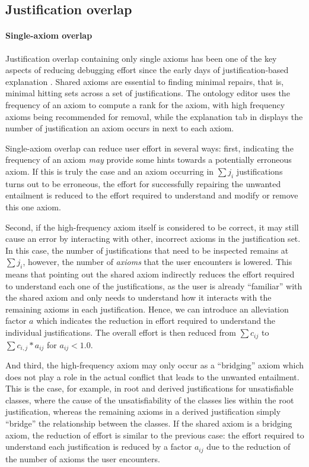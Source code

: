 \subsection{Justification overlap}

\paragraph{Single-axiom overlap}

Justification overlap containing only single axioms has been one of the key aspects of reducing debugging effort since the early days of justification-based explanation \cite{schlobach03nc,kalyanpur06nm}. Shared axioms are essential to finding minimal repairs, that is, minimal hitting sets across a set of justifications. The ontology editor \swoop uses the frequency of an axiom to compute a rank for the axiom, with high frequency axioms being recommended for removal, while the explanation tab in \protege displays the number of justification an axiom occurs in next to each axiom.

Single-axiom overlap can reduce user effort in several ways: first, indicating the frequency of an axiom \emph{may} provide some hints towards a potentially erroneous axiom. If this is truly the case and an axiom occurring in $\sum j_{i}$ justifications turns out to be erroneous, the effort for successfully repairing the unwanted entailment is reduced to the effort required to understand and modify or remove this one axiom.

Second, if the high-frequency axiom itself is considered to be correct, it may still cause an error by interacting with other, incorrect axioms in the justification set. In this case, the number of justifications that need to be inspected remains at $\sum j_{i}$, however, the number of \emph{axioms} that the user encounters is lowered. This means that pointing out the shared axiom indirectly reduces the effort required to understand each one of the justifications, as the user is already \enquote{familiar} with the shared axiom and only needs to understand how it interacts with the remaining axioms in each justification. Hence, we can introduce an alleviation factor $a$ which indicates the reduction in effort required to understand the individual justifications. The overall effort is then reduced from $\sum c_{ij}$ to $\sum c_{i,j} * a_{ij}$ for $a_{ij} < 1.0$.

And third, the high-frequency axiom may only occur as a \enquote{bridging} axiom which does not play a role in the actual conflict that leads to the unwanted entailment. This is the case, for example, in root and derived justifications for unsatisfiable classes, where the cause of the unsatisfiability of the classes lies within the root justification, whereas the remaining axioms in a derived justification simply \enquote{bridge} the relationship between the classes. If the shared axiom is a bridging axiom, the reduction of effort is similar to the previous case: the effort required to understand each justification is reduced by a factor $a_{ij}$ due to the reduction of the number of axioms the user encounters.

